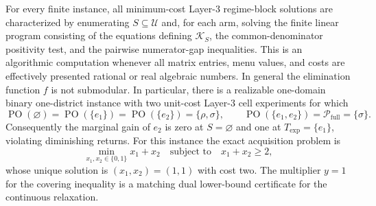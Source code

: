 For every finite instance, all minimum-cost Layer-3 regime-block solutions are characterized by enumerating \(S\subseteq\mathcal U\) and, for each arm, solving the finite linear program consisting of the equations defining \(\mathcal K_S\), the common-denominator positivity test, and the pairwise numerator-gap inequalities. This is an algorithmic computation whenever all matrix entries, menu values, and costs are effectively presented rational or real algebraic numbers. In general the elimination function \(f\) is not submodular. In particular, there is a realizable one-domain binary one-district instance with two unit-cost Layer-3 cell experiments for which
\[
\operatorname{PO}(\varnothing)=\operatorname{PO}(\{e_1\})
=\operatorname{PO}(\{e_2\})=\{\rho,\sigma\},
\qquad
\operatorname{PO}(\{e_1,e_2\})=\mathcal P_{\mathrm{full}}=\{\sigma\}.
\]
Consequently the marginal gain of \(e_2\) is zero at \(S=\varnothing\) and one at \(T_{\mathrm{exp}}=\{e_1\}\), violating diminishing returns. For this instance the exact acquisition problem is
\[
\min_{x_1,x_2\in\{0,1\}}x_1+x_2
\quad\text{subject to}\quad x_1+x_2\geq2,
\]
whose unique solution is \((x_1,x_2)=(1,1)\) with cost two. The multiplier \(y=1\) for the covering inequality is a matching dual lower-bound certificate for the continuous relaxation.